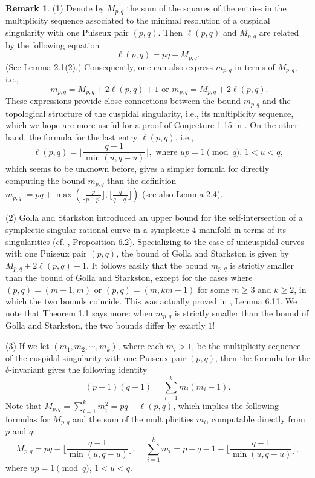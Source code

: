 \documentclass[11pt]{amsart}
\theoremstyle{plain}
\numberwithin{theorem}{section}
\theoremstyle{definition}
\newtheorem{remark}[theorem]{Remark}
\begin{document}
\begin{remark}
(1) Denote by $M_{p,q}$ the sum of the squares of the entries in the multiplicity sequence associated to the minimal resolution of a cuspidal singularity with one Puiseux pair $(p,q)$. Then $\ell(p,q)$ and
$M_{p,q}$ are related by the following equation
$$
\ell(p,q)=pq-M_{p,q}. 
$$
(See Lemma 2.1(2).) Consequently, one can also express $m_{p,q}$ in terms of $M_{p,q}$, i.e., 
$$
\mbox{ $m_{p,q}=M_{p,q}+2\ell(p,q)+1$ or $m_{p,q}=M_{p,q}+2\ell(p,q)$. }
$$
These expressions provide close connections between the bound $m_{p,q}$ and the topological structure of the cuspidal singularity, i.e., its multiplicity sequence, which we hope are more useful for a
proof of Conjecture 1.15 in \cite{C}. On the other hand, the formula for the last entry $\ell(p,q)$, i.e.,
$$
\ell(p,q)=\lfloor \frac{q-1}{\min(u,q-u)} \rfloor, \mbox{ where $up=1\pmod{q}$, $1<u<q$,}
$$
which seems to be unknown before, gives a simpler formula for directly computing the bound 
$m_{p,q}$ than the definition $m_{p,q}:=pq +\max (\lfloor \frac{p}{p-p^\prime}\rfloor, \lfloor \frac{q}{q-q^\prime}\rfloor)$ (see also Lemma 2.4).

(2) Golla and Starkston introduced an upper bound for the self-intersection of a symplectic singular rational curve in a symplectic $4$-manifold in terms of its singularities (cf. \cite{GS}, Proposition 6.2). Specializing to the case of unicuspidal curves with one Puiseux pair $(p,q)$, the bound of Golla and Starkston is given by $M_{p,q}+2\ell(p,q)+1$. It follows easily that the bound $m_{p,q}$ is strictly 
smaller than the bound of Golla and Starkston, except for the cases where $(p,q)=(m-1,m)$ or 
$(p,q)=(m,km-1)$ for some $m\geq 3$ and $k\geq 2$, in which the two bounds coincide.  This was actually proved in \cite{C}, Lemma 6.11. We note that Theorem 1.1 says more: when $m_{p,q}$ is strictly smaller than the bound of Golla and Starkston, the two bounds differ by exactly $1$!


(3) If we let $(m_1,m_2,\cdots,m_k)$, where each $m_i>1$, be the multiplicity sequence of the 
cuspidal singularity with one Puiseux pair $(p,q)$, then the formula for the $\delta$-invariant gives the following identity
$$
(p-1)(q-1)=\sum_{i=1}^k m_i (m_i-1). 
$$
Note that $M_{p,q}=\sum_{i=1}^k m_i^2=pq-\ell(p,q)$, which implies the following formulas for 
$M_{p,q}$ and the sum of the multiplicities $m_i$, computable directly from $p$ and $q$: 
$$
M_{p,q}=pq-\lfloor \frac{q-1}{\min(u,q-u)} \rfloor,  \;\; \;\;
\sum_{i=1}^k m_i=p+q-1-\lfloor \frac{q-1}{\min(u,q-u)} \rfloor,
$$
where $up=1\pmod{q}$, $1<u<q$.
\end{remark}
\end{document}
